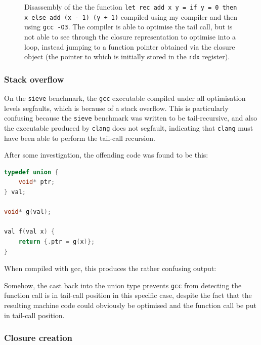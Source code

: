 \documentclass[12pt,a4paper,twoside,openright]{report}
\begin{document}
\begin{figure}
    \label{fig:tail-recursion}
    \centering
    
    \caption{Disassembly of the the function \texttt{let rec add x y = if y = 0 
    then x else add (x - 1) (y + 1)} compiled using my compiler and then using 
    \texttt{gcc -O3}. The compiler is able to optimise the tail call, but is 
    not able to see through the closure representation to optimise into a loop, 
    instead jumping to a function pointer obtained via the closure object (the 
    pointer to which is initially stored in the \texttt{rdx} register).}
\end{figure}

\subsubsection{Stack overflow} \label{stack-overflow}

On the \texttt{sieve} benchmark, the \texttt{gcc} executable compiled under all 
optimisation levels segfaults, which is because of a stack overflow. This is 
particularly confusing because the \texttt{sieve} benchmark was written to be 
tail-recursive, and also the executable produced by \texttt{clang} does not 
segfault, indicating that \texttt{clang} must have been able to perform the 
tail-call recursion.

After some investigation, the offending code was found to be this:

\begin{lstlisting}[language=C]
typedef union {
    void* ptr;
} val;

void* g(val);

val f(val x) {
    return {.ptr = g(x)};
}
\end{lstlisting}

When compiled with gcc, this produces the rather confusing output:



Somehow, the cast back into the union type prevents \texttt{gcc} from detecting 
the function call is in tail-call position in this specific case, despite the 
fact that the resulting machine code could obviously be optimised and the 
function call be put in tail-call position.

\subsubsection{Closure creation}
\end{document}
